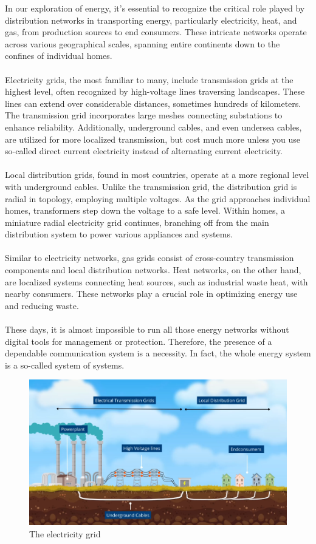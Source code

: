 \documentclass[../summary.tex]{subfiles}
\begin{document}
In our exploration of energy, it's essential to recognize the critical role played by distribution networks in transporting energy, particularly electricity, heat, and gas, from production sources to end consumers. These intricate networks operate across various geographical scales, spanning entire continents down to the confines of individual homes.\\
\\
Electricity grids, the most familiar to many, include transmission grids at the highest level, often recognized by high-voltage lines traversing landscapes. These lines can extend over considerable distances, sometimes hundreds of kilometers. The transmission grid incorporates large meshes connecting substations to enhance reliability. Additionally, underground cables, and even undersea cables, are utilized for more localized transmission, but cost much more unless you use so-called direct current electricity instead of alternating current electricity.\\
\\
Local distribution grids, found in most countries, operate at a more regional level with underground cables. Unlike the transmission grid, the distribution grid is radial in topology, employing multiple voltages. As the grid approaches individual homes, transformers step down the voltage to a safe level. Within homes, a miniature radial electricity grid continues, branching off from the main distribution system to power various appliances and systems.\\
\\
Similar to electricity networks, gas grids consist of cross-country transmission components and local distribution networks. Heat networks, on the other hand, are localized systems connecting heat sources, such as industrial waste heat, with nearby consumers. These networks play a crucial role in optimizing energy use and reducing waste.\\
\\
These days, it is almost impossible to run all those energy networks without digital tools for management or protection. Therefore, the presence of a dependable communication system is a necessity. In fact, the whole energy system is a so-called system of systems.

\begin{figure}[H]
	\centering
	\includegraphics[width=0.8\linewidth]{../images/electricity_grid}
	\caption{The electricity grid}
	\label{fig:electricitygrid}
\end{figure}
\end{document}
